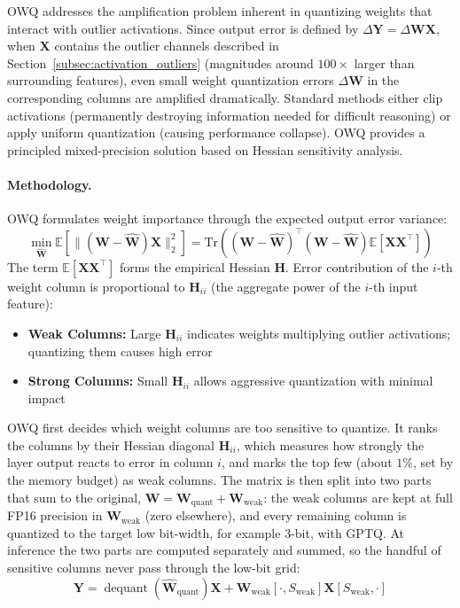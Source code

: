 OWQ addresses the amplification problem inherent in quantizing weights that interact with outlier activations. Since output error is defined by $\Delta \bm{Y} = \Delta \bm{W} \bm{X}$, when $\bm{X}$ contains the outlier channels described in Section~\ref{subsec:activation_outliers} (magnitudes around $100\times$ larger than surrounding features), even small weight quantization errors $\Delta \bm{W}$ in the corresponding columns are amplified dramatically. Standard methods either clip activations (permanently destroying information needed for difficult reasoning) or apply uniform quantization (causing performance collapse). OWQ provides a principled mixed-precision solution based on Hessian sensitivity analysis.

\paragraph{Methodology.}
OWQ formulates weight importance through the expected output error variance:
\begin{equation}
\min_{\hat{\bm{W}}} \mathbb{E}\left[ \| (\bm{W} - \hat{\bm{W}})\bm{X} \|_2^2 \right] = \text{Tr}\left( (\bm{W} - \hat{\bm{W}})^\top (\bm{W} - \hat{\bm{W}}) \mathbb{E}[\bm{X}\bm{X}^\top] \right)
\end{equation}
The term $\mathbb{E}[\bm{X}\bm{X}^\top]$ forms the empirical Hessian $\bm{H}$. Error contribution of the $i$-th weight column is proportional to $\bm{H}_{ii}$ (the aggregate power of the $i$-th input feature):
\begin{itemize}
\item \textbf{Weak Columns:} Large $\bm{H}_{ii}$ indicates weights multiplying outlier activations; quantizing them causes high error
\item \textbf{Strong Columns:} Small $\bm{H}_{ii}$ allows aggressive quantization with minimal impact
\end{itemize}

OWQ first decides which weight columns are too sensitive to quantize. It ranks the columns by their Hessian diagonal $\bm{H}_{ii}$, which measures how strongly the layer output reacts to error in column $i$, and marks the top few (about $1\%$, set by the memory budget) as weak columns. The matrix is then split into two parts that sum to the original, $\bm{W} = \bm{W}_{\text{quant}} + \bm{W}_{\text{weak}}$: the weak columns are kept at full FP16 precision in $\bm{W}_{\text{weak}}$ (zero elsewhere), and every remaining column is quantized to the target low bit-width, for example 3-bit, with GPTQ. At inference the two parts are computed separately and summed, so the handful of sensitive columns never pass through the low-bit grid:
\begin{equation}
\bm{Y} = \operatorname{dequant}(\hat{\bm{W}}_{\text{quant}}) \bm{X} + \bm{W}_{\text{weak}}[\cdot, S_{\text{weak}}] \bm{X}[S_{\text{weak}}, \cdot]
\end{equation}

